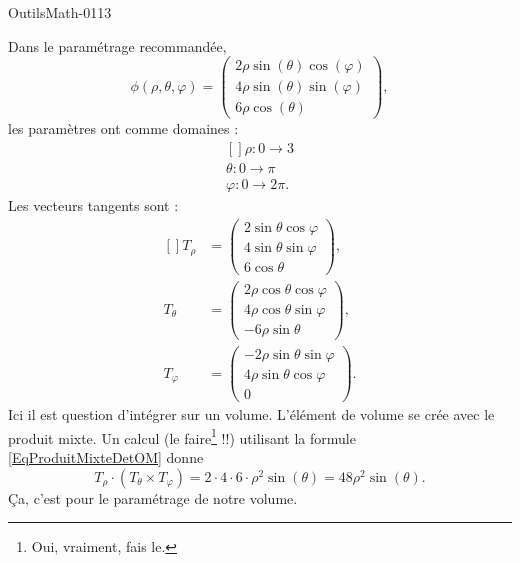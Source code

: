 
\begin{corrige}{OutilsMath-0113}

    Dans le paramétrage recommandée,
    \begin{equation}
        \phi(\rho,\theta,\varphi)=\begin{pmatrix}
            2\rho\sin(\theta)\cos(\varphi)    \\ 
            4\rho\sin(\theta)\sin(\varphi)    \\ 
            6\rho\cos(\theta)    
        \end{pmatrix},
    \end{equation}
    les paramètres ont comme domaines :
    \begin{equation}
        \begin{aligned}[]
            \rho\colon 0\to 3\\
            \theta\colon 0\to \pi\\
            \varphi\colon 0\to 2\pi.
        \end{aligned}
    \end{equation}
    Les vecteurs tangents sont :
    \begin{equation}
        \begin{aligned}[]
            T_{\rho}&=\begin{pmatrix}
                2\sin\theta\cos\varphi    \\ 
                4\sin\theta\sin\varphi    \\ 
                6\cos\theta    
            \end{pmatrix},\\
            T_{\theta}&=\begin{pmatrix}
                2\rho\cos\theta\cos\varphi    \\ 
                4\rho\cos\theta\sin\varphi    \\ 
                -6\rho\sin\theta    
            \end{pmatrix},\\
            T_{\varphi}&=\begin{pmatrix}
                -2\rho\sin\theta\sin\varphi    \\ 
                4\rho\sin\theta\cos\varphi    \\ 
                0    
            \end{pmatrix}.
        \end{aligned}
    \end{equation}
    Ici il est question d'intégrer sur un volume. L'élément de volume se crée avec le produit mixte. Un calcul (le faire\footnote{Oui, vraiment, fais le.} !!) utilisant la formule \eqref{EqProduitMixteDetOM} donne
    \begin{equation}
        T_{\rho}\cdot(T_{\theta}\times T_{\varphi})=2\cdot 4\cdot 6\cdot\rho^2\sin(\theta)=48\rho^2\sin(\theta).
    \end{equation}
    Ça, c'est pour le paramétrage de notre volume.


\end{corrige}
